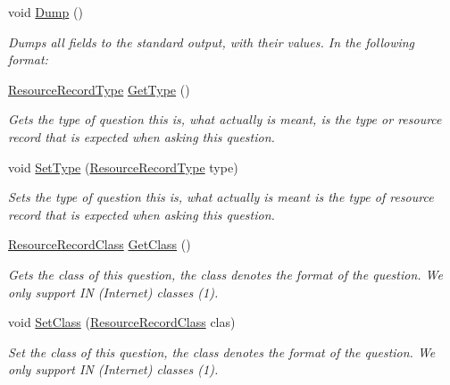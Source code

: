 \begin{DoxyCompactItemize}
void \hyperlink{class_senergy_1_1_dns_1_1_message_question_a7ac084601ff3285c6e47e7ce7ccc09cf}{Dump} ()
\begin{DoxyCompactList}\small\item\em Dumps all fields to the standard output, with their values. In the following format\-: \end{DoxyCompactList}\item 
\hyperlink{namespace_senergy_1_1_dns_a590bfd748c955364770f5ce358d9dfe0}{Resource\-Record\-Type} \hyperlink{class_senergy_1_1_dns_1_1_message_question_a66d9d051672d30c1f4b5663d25430ec8}{Get\-Type} ()
\begin{DoxyCompactList}\small\item\em Gets the type of question this is, what actually is meant, is the type or resource record that is expected when asking this question. \end{DoxyCompactList}\item 
void \hyperlink{class_senergy_1_1_dns_1_1_message_question_a3fbcbad88592bf5cde58c7b22119cc4f}{Set\-Type} (\hyperlink{namespace_senergy_1_1_dns_a590bfd748c955364770f5ce358d9dfe0}{Resource\-Record\-Type} type)
\begin{DoxyCompactList}\small\item\em Sets the type of question this is, what actually is meant is the type of resource record that is expected when asking this question. \end{DoxyCompactList}\item 
\hyperlink{namespace_senergy_1_1_dns_a953f153bc411213d621d00c1e1b3eb9d}{Resource\-Record\-Class} \hyperlink{class_senergy_1_1_dns_1_1_message_question_ae86936e1268d7abf0a2210df9caa0840}{Get\-Class} ()
\begin{DoxyCompactList}\small\item\em Gets the class of this question, the class denotes the format of the question. We only support I\-N (Internet) classes (1). \end{DoxyCompactList}\item 
void \hyperlink{class_senergy_1_1_dns_1_1_message_question_a8676f25315240afe4473154f3708d3e5}{Set\-Class} (\hyperlink{namespace_senergy_1_1_dns_a953f153bc411213d621d00c1e1b3eb9d}{Resource\-Record\-Class} clas)
\begin{DoxyCompactList}\small\item\em Set the class of this question, the class denotes the format of the question. We only support I\-N (Internet) classes (1). \end{DoxyCompactList}\end{DoxyCompactItemize}


